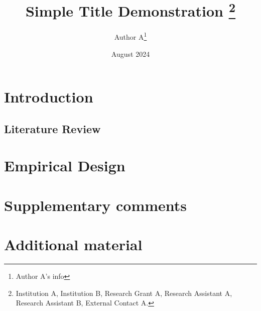 \documentclass{article}%
\title{%
Simple Title Demonstration
    \thanks{%
Institution A, Institution B, Research Grant A, Research Assistant A, Research Assistant B, External Contact A.} }
\author{Author A\thanks{Author A's info}} %
\date{August 2024}%
\begin{document}

    \maketitle%
\newpage

\section{Introduction}

\blindtext

\subsection{Literature Review}

\blindtext

\section{Empirical Design}

\blindtext

\newpage

\appendix

\section{Supplementary comments}
\blindtext

\section{Additional material}

\blindtext
\end{document}
